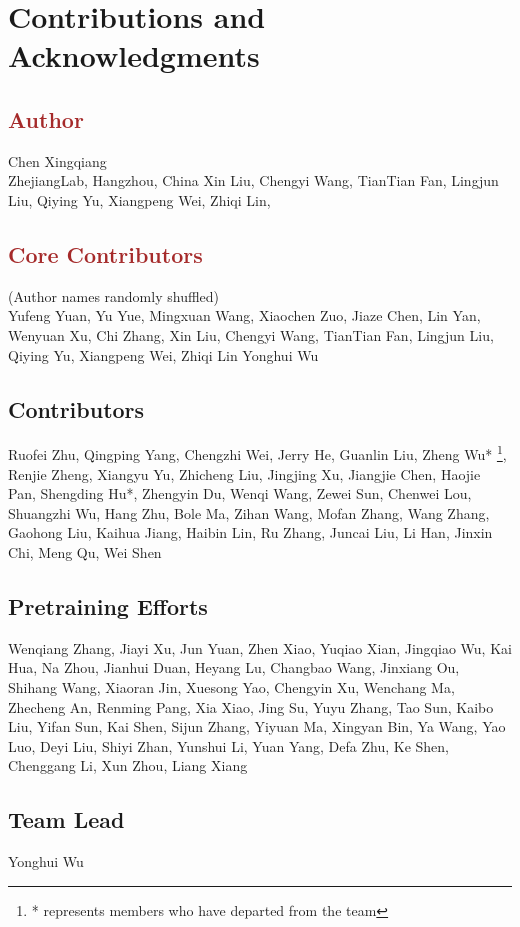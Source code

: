 \newpage
\section*{Contributions and Acknowledgments}

\subsection*{\textcolor{brown}{Author}}
Chen Xingqiang \\
ZhejiangLab, Hangzhou, China
Xin Liu,
Chengyi Wang,
TianTian Fan,
Lingjun Liu,
Qiying Yu,
Xiangpeng Wei,
Zhiqi Lin,

\subsection*{\textcolor{brown}{Core Contributors}}
(Author names randomly shuffled) \\
Yufeng Yuan, 
Yu Yue, 
Mingxuan Wang, 
Xiaochen Zuo,  
Jiaze Chen, 
Lin Yan, 
Wenyuan Xu, 
Chi Zhang, 
Xin Liu, 
Chengyi Wang, 
TianTian Fan, 
Lingjun Liu, 
Qiying Yu, 
Xiangpeng Wei, 
Zhiqi Lin
Yonghui Wu

\subsection*{Contributors}
Ruofei Zhu, 
Qingping Yang, 
Chengzhi Wei, 
Jerry He, 
Guanlin Liu, 
Zheng Wu* \footnote{* represents members who have departed from the team}, 
Renjie Zheng, 
Xiangyu Yu, 
Zhicheng Liu, 
Jingjing Xu, 
Jiangjie Chen, 
Haojie Pan, 
Shengding Hu*, 
Zhengyin Du, 
Wenqi Wang, 
Zewei Sun, 
Chenwei Lou, 
Shuangzhi Wu, 
Hang Zhu, 
Bole Ma, 
Zihan Wang, 
Mofan Zhang, 
Wang Zhang, 
Gaohong Liu, 
Kaihua Jiang, 
Haibin Lin, 
Ru Zhang, 
Juncai Liu, 
Li Han, 
Jinxin Chi, 
Meng Qu, 
Wei Shen

\subsection*{Pretraining Efforts}
Wenqiang Zhang, 
Jiayi Xu, 
Jun Yuan, 
Zhen Xiao, 
Yuqiao Xian, 
Jingqiao Wu, 
Kai Hua, 
Na Zhou, 
Jianhui Duan, 
Heyang Lu, 
Changbao Wang, 
Jinxiang Ou, 
Shihang Wang, 
Xiaoran Jin, 
Xuesong Yao, 
Chengyin Xu, 
Wenchang Ma, 
Zhecheng An, 
Renming Pang, 
Xia Xiao, 
Jing Su, 
Yuyu Zhang, 
Tao Sun, 
Kaibo Liu, 
Yifan Sun, 
Kai Shen, 
Sijun Zhang, 
Yiyuan Ma, 
Xingyan Bin, 
Ya Wang, 
Yao Luo, 
Deyi Liu, 
Shiyi Zhan, 
Yunshui Li, 
Yuan Yang, 
Defa Zhu, 
Ke Shen, 
Chenggang Li, 
Xun Zhou, 
Liang Xiang

\subsection*{Team Lead}

Yonghui Wu
